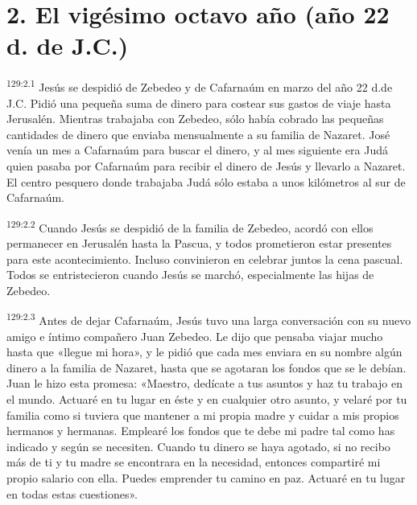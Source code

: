 \section*{2. El vigésimo octavo año (año 22 d. de J.C.)}
\par 
\textsuperscript{129:2.1} Jesús se despidió de Zebedeo y de Cafarnaúm en marzo del año 22 d.de J.C. Pidió una pequeña suma de dinero para costear sus gastos de viaje hasta Jerusalén. Mientras trabajaba con Zebedeo, sólo había cobrado las pequeñas cantidades de dinero que enviaba mensualmente a su familia de Nazaret. José venía un mes a Cafarnaúm para buscar el dinero, y al mes siguiente era Judá quien pasaba por Cafarnaúm para recibir el dinero de Jesús y llevarlo a Nazaret. El centro pesquero donde trabajaba Judá sólo estaba a unos kilómetros al sur de Cafarnaúm.

\par 
\textsuperscript{129:2.2} Cuando Jesús se despidió de la familia de Zebedeo, acordó con ellos permanecer en Jerusalén hasta la Pascua, y todos prometieron estar presentes para este acontecimiento. Incluso convinieron en celebrar juntos la cena pascual. Todos se entristecieron cuando Jesús se marchó, especialmente las hijas de Zebedeo.

\par 
\textsuperscript{129:2.3} Antes de dejar Cafarnaúm, Jesús tuvo una larga conversación con su nuevo amigo e íntimo compañero Juan Zebedeo. Le dijo que pensaba viajar mucho hasta que «llegue mi hora», y le pidió que cada mes enviara en su nombre algún dinero a la familia de Nazaret, hasta que se agotaran los fondos que se le debían. Juan le hizo esta promesa: «Maestro, dedícate a tus asuntos y haz tu trabajo en el mundo. Actuaré en tu lugar en éste y en cualquier otro asunto, y velaré por tu familia como si tuviera que mantener a mi propia madre y cuidar a mis propios hermanos y hermanas. Emplearé los fondos que te debe mi padre tal como has indicado y según se necesiten. Cuando tu dinero se haya agotado, si no recibo más de ti y tu madre se encontrara en la necesidad, entonces compartiré mi propio salario con ella. Puedes emprender tu camino en paz. Actuaré en tu lugar en todas estas cuestiones».

